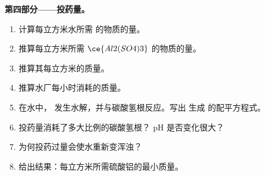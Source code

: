 \begin{problem}
\medskip\noindent\textbf{第四部分——投药量。}
\begin{enumerate}[resume]
  \item 计算每立方米水所需  的物质的量。
  \item 推算每立方米所需 $\ce{Al2(SO4)3}$ 的物质的量。
  \item 推算其每立方米的质量。
  \item 推算水厂每小时消耗的质量。
  \item 在水中， 发生水解，并与碳酸氢根反应。写出
        生成  的配平方程式。
  \item 投药量消耗了多大比例的碳酸氢根？
        pH 是否变化很大？
  \item 为何投药过量会使水重新变浑浊？
  \item 给出结果：每立方米所需硫酸铝的最小质量。
\end{enumerate}
\end{problem}
